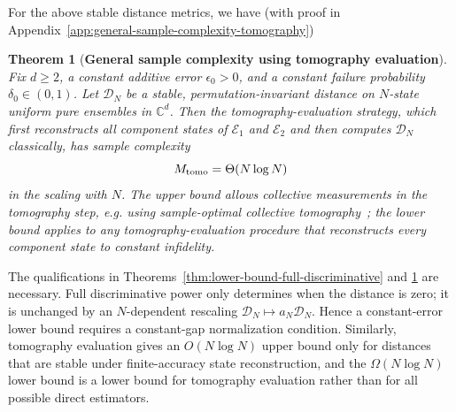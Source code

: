 \documentclass[aps,prx,reprint,superscriptaddress,amsmath,amssymb,longbibliography,floatfix]{revtex4-2}
\newcommand{\scD}{\mathcal{D}}
\newcommand{\scE}{\mathcal{E}}
\theoremstyle{plain}
\newtheorem{theorem}{Theorem}[section]
\theoremstyle{definition}
\theoremstyle{remark}
\begin{document}
For the above stable distance metrics, we have (with proof in Appendix~\ref{app:general-sample-complexity-tomography})
\begin{theorem}[\textbf{General sample complexity using tomography evaluation}]
\label{thm:general-sample-complexity-tomography}
Fix \(d\ge 2\), a constant additive error \(\epsilon_0>0\), and a constant failure
probability \(\delta_0\in(0,1)\). Let \(\scD_N\) be a stable,
permutation-invariant distance on \(N\)-state uniform pure ensembles in \(\mathbb C^d\).
Then the tomography-evaluation strategy, which first reconstructs all component states of
\(\scE_1\) and \(\scE_2\) and then computes \(\scD_N\) classically, has sample complexity
\[
    M_{\rm tomo}=\Theta(N\log N)
\]
in the scaling with \(N\). 
The upper bound allows collective measurements in the
tomography step, e.g. using sample-optimal collective tomography~\cite{sample_optimal_tomography_7956181};
the lower bound applies to any tomography-evaluation procedure that reconstructs every
component state to constant infidelity.


\end{theorem}



The qualifications in Theorems~\ref{thm:lower-bound-full-discriminative} and
\ref{thm:general-sample-complexity-tomography} are necessary. Full discriminative power
only determines when the distance is zero; it is unchanged by an \(N\)-dependent rescaling
\(\scD_N\mapsto a_N\scD_N\). Hence a constant-error lower bound requires a constant-gap
normalization condition. Similarly, tomography evaluation gives an \(O(N\log N)\) upper
bound only for distances that are stable under finite-accuracy state reconstruction, and
the \(\Omega(N\log N)\) lower bound is a lower bound for tomography evaluation rather
than for all possible direct estimators.
\end{document}
